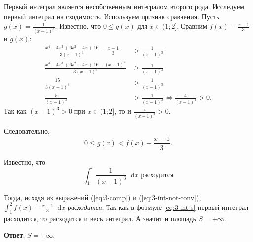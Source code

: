 \documentclass[a4paper,12pt]{article}
\newcommand*\diff{\mathop{}\!\mathrm{d}}
\begin{document}
Первый интеграл является несобственным интегралом второго рода.
Исследуем первый интеграл на сходимость.
Используем признак сравнения.
Пусть \(g(x) = \frac{1}{{(x - 1)}^3}\).
Известно, что \(0 \le g(x)\) для \(x \in (1; 2]\).
Сравним \(f(x) - \frac{x - 1}{3}\) и \(g(x)\):
\begin{align*}
  \frac{x^4 - 4 x^3 + 6 x^2 - 4 x + 16}{3 {(x - 1)}^3} - \frac{x - 1}{3}
  &> \frac{1}{{(x - 1)}^3} \\
  \frac{x^4 - 4 x^3 + 6 x^2 - 4 x + 16 - {(x - 1)}^4}{3 {(x - 1)}^3}
  &> \frac{1}{{(x - 1)}^3} \\
  \frac{15}{3 {(x - 1)}^3} &> \frac{1}{{(x - 1)}^3} \\
  \frac{5}{{(x - 1)}^3} &> \frac{1}{{(x - 1)}^3} \Leftrightarrow
  \frac{4}{{(x - 1)}^3} > 0.
\end{align*}
Так как \({(x - 1)}^3 > 0\) при \(x \in (1; 2]\),
то и \(\frac{4}{{(x - 1)}^3} > 0\).

Следовательно,
\begin{equation} \label{eq:3-comp}
  0 \le g(x) < f(x) - \frac{x - 1}{3}.
\end{equation}

Известно, что
\begin{equation} \label{eq:3-int-not-conv}
  \int_{1}^{c} \frac{1}{{(x - 1)}^3} \diff x \text{ расходится}
\end{equation}

Тогда, исходя из выражений (\ref{eq:3-comp}) и (\ref{eq:3-int-not-conv}),
\(\int_{1}^{2} f(x) - \frac{x - 1}{3} \diff x\) \textit{расходится}.
Так как в формуле \ref{eq:3-int-s} первый интеграл расходится,
то расходится и весь интеграл.
А значит и площадь \(S = +\infty\).

\textbf{Ответ}: \(S = +\infty\).
\end{document}
